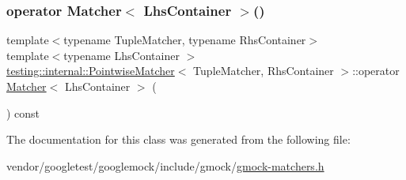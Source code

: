 \subsubsection{\texorpdfstring{operator Matcher$<$ Lhs\+Container $>$()}{operator Matcher< LhsContainer >()}}
{\footnotesize\ttfamily template$<$typename Tuple\+Matcher, typename Rhs\+Container$>$ \\
template$<$typename Lhs\+Container $>$ \\
\hyperlink{classtesting_1_1internal_1_1_pointwise_matcher}{testing\+::internal\+::\+Pointwise\+Matcher}$<$ Tuple\+Matcher, Rhs\+Container $>$\+::operator \hyperlink{classtesting_1_1_matcher}{Matcher}$<$ Lhs\+Container $>$ (\begin{DoxyParamCaption}{ }\end{DoxyParamCaption}) const\hspace{0.3cm}{\ttfamily [inline]}}



The documentation for this class was generated from the following file\+:\begin{DoxyCompactItemize}
\item 
vendor/googletest/googlemock/include/gmock/\hyperlink{gmock-matchers_8h}{gmock-\/matchers.\+h}\end{DoxyCompactItemize}
